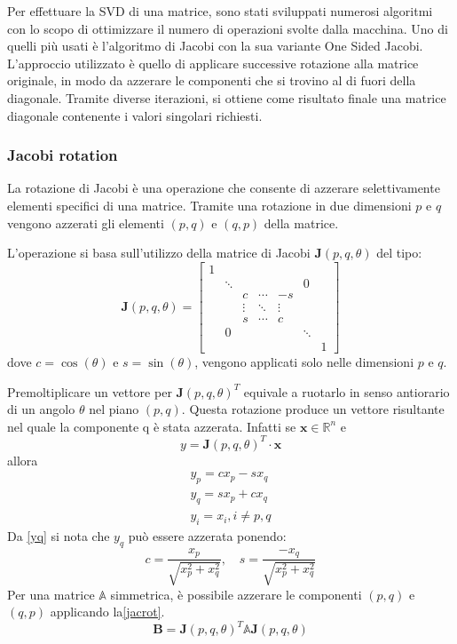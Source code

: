 Per effettuare la SVD di una matrice, sono stati sviluppati numerosi algoritmi con lo scopo di ottimizzare il numero di operazioni svolte dalla macchina.
Uno di quelli più usati è l'algoritmo di Jacobi con la sua variante One Sided Jacobi. L'approccio utilizzato è quello di applicare successive rotazione alla matrice originale, in modo da azzerare le componenti che si trovino al di fuori della diagonale. Tramite diverse iterazioni, si ottiene come risultato finale una matrice diagonale contenente i valori singolari richiesti.
\subsubsection{Jacobi rotation}
La rotazione di Jacobi è una operazione che consente di azzerare selettivamente elementi specifici di una matrice. Tramite una rotazione in due dimensioni $p$ e $q$ vengono azzerati gli elementi $(p,q)$ e $(q,p)$ della matrice.

L'operazione si basa sull'utilizzo della matrice di Jacobi $\mathbf{J}(p,q,\theta)$ del tipo:
\begin{equation}
\mathbf{J}(p,q,\theta)=\begin{bmatrix}
1 &  &  &  &  &  & \\
& \ddots &  &  &  & 0 & \\
&  & c & \cdots & -s &  & \\
&  & \vdots & \ddots & \vdots &  & \\
&  & s & \cdots & c &  & \\
& 0 &  &  &  & \ddots & \\
&  &  &  &  &  & 1
\end{bmatrix}
\end{equation}
dove $c=\cos(\theta)$ e $s=\sin(\theta)$, vengono applicati solo nelle dimensioni $p$ e $q$.

Premoltiplicare un vettore per $\mathbf{J}(p,q,\theta)^T$ equivale a ruotarlo in senso antiorario di un angolo $\theta$ nel piano $(p,q)$. Questa rotazione produce un vettore risultante nel quale la componente q è stata azzerata. Infatti se $\mathbf{x}\in\mathbb{R}^{n}$ e
\begin{equation}
y=\mathbf{J}(p,q,\theta)^T	\cdot \mathbf{x}
\end{equation}
allora
\begin{eqnarray}
y_p=cx_p-sx_q\\
y_q=sx_p+cx_q\label{yq}\\
y_i=x_i, i\neq p,q
\end{eqnarray}
Da \eqref{yq} si nota che $y_q$ può essere azzerata ponendo:
\begin{equation}
c=\frac{x_p}{\sqrt{x_p^2+x_q^2}},\quad s=\frac{-x_q}{\sqrt{x_p^2+x_q^2}}
\end{equation}
Per una matrice $\mathbb{A}$ simmetrica, è possibile azzerare le componenti $(p,q)$ e $(q,p)$ applicando la\eqref{jacrot}.
\begin{equation}\label{jacrot}
\mathbf{B}=\mathbf{J}(p,q,\theta)^T\mathbb{A}\mathbf{J}(p,q,\theta)
\end{equation}

